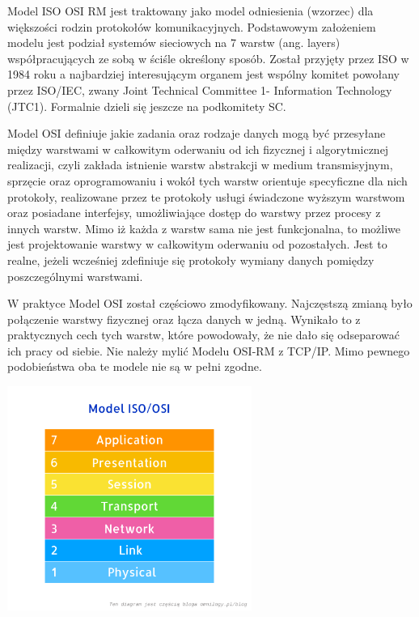 \documentclass{article}
\begin{document}
Model ISO OSI RM jest traktowany jako model odniesienia (wzorzec) dla większości rodzin protokołów komunikacyjnych. Podstawowym założeniem modelu jest podział systemów sieciowych na 7 warstw (ang. layers) współpracujących ze sobą w ściśle określony sposób. Został przyjęty przez ISO w 1984 roku a najbardziej interesującym organem jest wspólny komitet powołany przez ISO/IEC, zwany Joint Technical Committee 1- Information Technology (JTC1). Formalnie dzieli się jeszcze na podkomitety SC.
 
 Model OSI definiuje jakie zadania oraz rodzaje danych mogą być przesyłane między warstwami w całkowitym oderwaniu od ich fizycznej i algorytmicznej realizacji, czyli zakłada istnienie warstw abstrakcji w medium transmisyjnym, sprzęcie oraz oprogramowaniu i wokół tych warstw orientuje specyficzne dla nich protokoły, realizowane przez te protokoły usługi świadczone wyższym warstwom oraz posiadane interfejsy, umożliwiające dostęp do warstwy przez procesy z innych warstw. Mimo iż każda z warstw sama nie jest funkcjonalna, to możliwe jest projektowanie warstwy w całkowitym oderwaniu od pozostałych. Jest to realne, jeżeli wcześniej zdefiniuje się protokoły wymiany danych pomiędzy poszczególnymi warstwami.
 
 W praktyce Model OSI został częściowo zmodyfikowany. Najczęstszą zmianą było połączenie warstwy fizycznej oraz łącza danych w jedną. Wynikało to z praktycznych cech tych warstw, które powodowały, że nie dało się odseparować ich pracy od siebie. Nie należy mylić Modelu OSI-RM z TCP/IP. Mimo pewnego podobieństwa oba te modele nie są w pełni zgodne.
 


\includegraphics[width=0.6\textwidth]{OSI.png}

 
\end{document}
